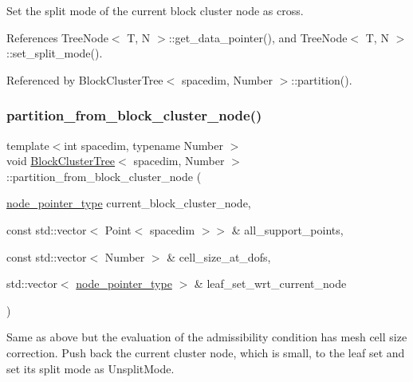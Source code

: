 Set the split mode of the current block cluster node as cross.

References Tree\+Node$<$ T, N $>$\+::get\+\_\+data\+\_\+pointer(), and Tree\+Node$<$ T, N $>$\+::set\+\_\+split\+\_\+mode().



Referenced by Block\+Cluster\+Tree$<$ spacedim, Number $>$\+::partition().

\mbox{\label{classBlockClusterTree_a425583a70d63ddbf9341a31b736bd0fe}} 
\subsubsection{\texorpdfstring{partition\+\_\+from\+\_\+block\+\_\+cluster\+\_\+node()}{partition\_from\_block\_cluster\_node()}\hspace{0.1cm}{\footnotesize\ttfamily [2/2]}}
{\footnotesize\ttfamily template$<$int spacedim, typename Number $>$ \\
void \hyperlink{classBlockClusterTree}{Block\+Cluster\+Tree}$<$ spacedim, Number $>$\+::partition\+\_\+from\+\_\+block\+\_\+cluster\+\_\+node (\begin{DoxyParamCaption}\item[{\hyperlink{classTreeNode}{node\+\_\+pointer\+\_\+type}}]{current\+\_\+block\+\_\+cluster\+\_\+node,  }\item[{const std\+::vector$<$ Point$<$ spacedim $>$$>$ \&}]{all\+\_\+support\+\_\+points,  }\item[{const std\+::vector$<$ Number $>$ \&}]{cell\+\_\+size\+\_\+at\+\_\+dofs,  }\item[{std\+::vector$<$ \hyperlink{classTreeNode}{node\+\_\+pointer\+\_\+type} $>$ \&}]{leaf\+\_\+set\+\_\+wrt\+\_\+current\+\_\+node }\end{DoxyParamCaption})\hspace{0.3cm}{\ttfamily [private]}}

Same as above but the evaluation of the admissibility condition has mesh cell size correction. Push back the current cluster node, which is small, to the leaf set and set its split mode as {\ttfamily Unsplit\+Mode}.

